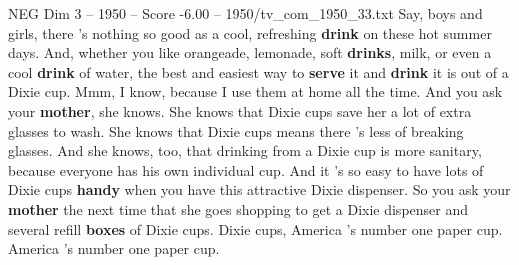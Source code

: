 \begin{textsample}{NEG Dim 3 – 1950 – Score -6.00 – 1950/tv\_com\_1950\_33.txt}  \label{ex:f3_neg_081}
Say, boys and girls, there 's nothing so good as a cool, refreshing \textbf{drink} on these hot summer days.
And, whether you like orangeade, lemonade, soft \textbf{drinks}, milk, or even a cool \textbf{drink} of water, the best and easiest way to \textbf{serve} it and \textbf{drink} it is out of a Dixie cup.
Mmm, I know, because I use them at home all the time.
And you ask your \textbf{mother}, she knows.
She knows that Dixie cups save her a lot of extra glasses to wash.
She knows that Dixie cups means there 's less of breaking glasses.
And she knows, too, that drinking from a Dixie cup is more sanitary, because everyone has his own individual cup.
And it 's so easy to have lots of Dixie cups \textbf{handy} when you have this attractive Dixie dispenser.
So you ask your \textbf{mother} the next time that she goes shopping to get a Dixie dispenser and several refill \textbf{boxes} of Dixie cups.
Dixie cups, America 's number one paper cup.
America 's number one paper cup.

\end{textsample}

